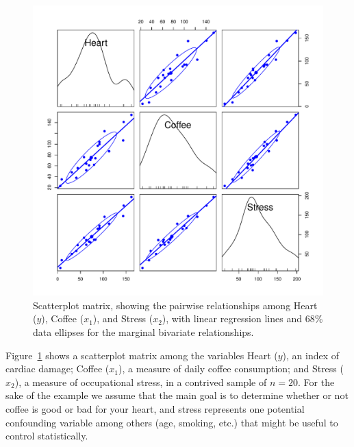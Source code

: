 \documentclass[11pt]{article}%
\newcommand*{\figref}[1]{Figure~\ref{#1}}
\begin{document}
\begin{figure}[htb]
  \centering
  \includegraphics[width=.6\textwidth,clip]{fig/vis-reg-coffee11}
  \caption{Scatterplot matrix, showing the pairwise relationships among Heart ($y$), Coffee ($x_1$), and Stress ($x_2$),
  with linear regression lines and 68\% data ellipses for the marginal bivariate relationships.
  }%
  \label{fig:vis-reg-coffee11}
\end{figure}

\figref{fig:vis-reg-coffee11} shows a scatterplot matrix among the variables
Heart ($y$), an index of cardiac damage; Coffee ($x_1$), a measure of daily
coffee consumption; and Stress ($x_2$), a measure of occupational stress, in a contrived
sample of $n=20$. For the sake of the example we assume that the main goal is
to determine whether or not coffee is good or bad for your heart, and stress
represents one potential confounding variable among others (age, smoking, etc.)
that might be useful to control statistically.
\end{document}
